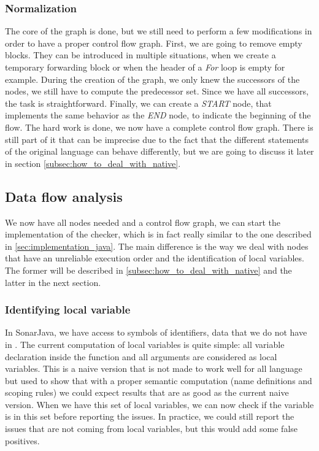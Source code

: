\subsubsection{Normalization}
\label{subsubsec:normalization_cfg}
The core of the graph is done, but we still need to perform a few modifications in order to have a proper control flow graph. 
First, we are going to remove empty blocks. 
They can be introduced in multiple situations, when we create a temporary forwarding block or when the header of a \emph{For} loop is empty for example.
During the creation of the graph, we only knew the successors of the nodes, we still have to compute the predecessor set. 
Since we have all successors, the task is straightforward. 
Finally, we can create a \emph{START} node, that implements the same behavior as the \emph{END} node, to indicate the beginning of the flow. \newline
The hard work is done, we now have a complete control flow graph. 
There is still part of it that can be imprecise due to the fact that the different statements of the original language can behave differently, but we are going to discuss it later in section \ref{subsec:how_to_deal_with_native}.

\subsection{Data flow analysis}
\label{subsec:data_flow_analysis}

We now have all nodes needed and a control flow graph, we can start the implementation of the checker, which is in fact really similar to the one described in \ref{sec:implementation_java}. 
The main difference is the way we deal with nodes that have an unreliable execution order and the identification of local variables.
The former will be described in \ref{subsec:how_to_deal_with_native} and the latter in the next section.

\subsubsection{Identifying local variable}
\label{subsubsec:identifying_local_variable}

In SonarJava, we have access to symbols of identifiers, data that we do not have in \slang{}. 
The current computation of local variables is quite simple: all variable declaration inside the function and all arguments are considered as local variables.
This is a naive version that is not made to work well for all language but used to show that with a proper semantic computation (name definitions and scoping rules) we could expect results that are as good as the current naive version. \newline
When we have this set of local variables, we can now check if the variable is in this set before reporting the issues. 
In practice, we could still report the issues that are not coming from local variables, but this would add some false positives.

